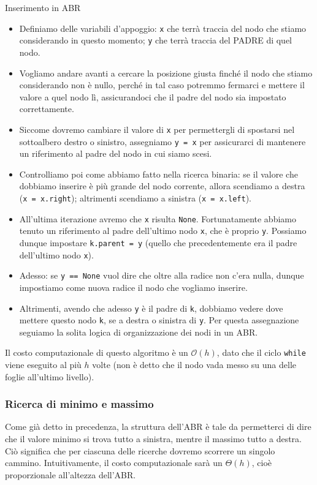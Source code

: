 \documentclass[12pt]{report}
\begin{document}
	\begin{algoritmo}{Inserimento in ABR}{}
		\begin{itemize}
			\item Definiamo delle variabili d'appoggio: \texttt{x} che terrà traccia del nodo che stiamo considerando in questo momento; \texttt{y} che terrà traccia del PADRE di quel nodo.
			\item Vogliamo andare avanti a cercare la posizione giusta finché il nodo che stiamo considerando non è nullo, perché in tal caso potremmo fermarci e mettere il valore a quel nodo lì, assicurandoci che il padre del nodo sia impostato correttamente.
			\item Siccome dovremo cambiare il valore di \texttt{x} per permettergli di spostarsi nel sottoalbero destro o sinistro, assegniamo \texttt{y = x} per assicurarci di mantenere un riferimento al padre del nodo in cui siamo scesi.
			\item Controlliamo poi come abbiamo fatto nella ricerca binaria: se il valore che dobbiamo inserire è più grande del nodo corrente, allora scendiamo a destra (\texttt{x = x.right}); altrimenti scendiamo a sinistra (\texttt{x = x.left}).
			\item All'ultima iterazione avremo che \texttt{x} risulta \texttt{None}. Fortunatamente abbiamo tenuto un riferimento al padre dell'ultimo nodo \texttt{x}, che è proprio \texttt{y}. Possiamo dunque impostare \texttt{k.parent = y} (quello che precedentemente era il padre dell'ultimo nodo \texttt{x}).
			\item Adesso: se \texttt{y == None} vuol dire che oltre alla radice non c'era nulla, dunque impostiamo come nuova radice il nodo che vogliamo inserire.
			\item Altrimenti, avendo che adesso \texttt{y} è il padre di \texttt{k}, dobbiamo vedere dove mettere questo nodo \texttt{k}, se a destra o sinistra di \texttt{y}. Per questa assegnazione seguiamo la solita logica di organizzazione dei nodi in un ABR.
		\end{itemize}
	\end{algoritmo}
	
	Il costo computazionale di questo algoritmo è un $\mathcal{O}(h)$, dato che il ciclo \texttt{while} viene eseguito al più $h$ volte (non è detto che il nodo vada messo su una delle foglie all'ultimo livello).
	
	\subsubsection*{Ricerca di minimo e massimo}
	Come già detto in precedenza, la struttura dell'ABR è tale da permetterci di dire che il valore minimo si trova tutto a sinistra, mentre il massimo tutto a destra. Ciò significa che per ciascuna delle ricerche dovremo scorrere un singolo cammino. Intuitivamente, il costo computazionale sarà un $\Theta(h)$, cioè proporzionale all'altezza dell'ABR.
	
\end{document}
